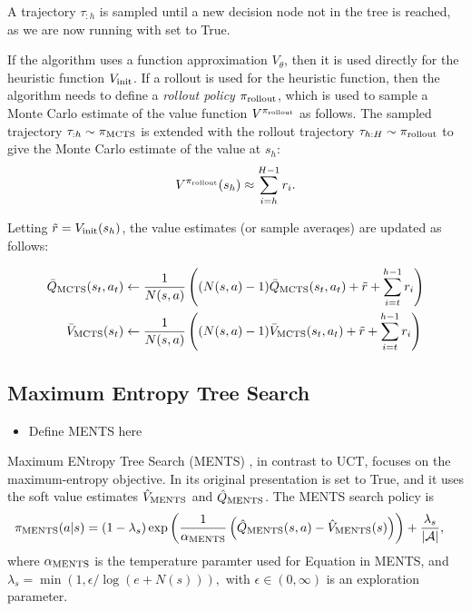        A trajectory $\tau_{:h}$ is sampled until a new decision node not in the tree is reached, as we are now running with \mctsmode set to True.

        If the algorithm uses a function approximation $V_\theta$, then it is used directly for the heuristic function ${V_{\textnormal{init}}}$. If a rollout is used for the heuristic function, then the algorithm needs to define a \textit{rollout policy} $\pi_{{\textnormal{rollout}}}$, which is used to sample a Monte Carlo estimate of the value function $V^{\pi_{{\textnormal{rollout}}}}$ as follows. The sampled trajectory $\tau_{:h}\sim\pi_{{\textnormal{MCTS}}}$ is extended with the rollout trajectory $\tau_{h:H}\sim\pi_{{\textnormal{rollout}}}$ to give the Monte Carlo estimate of the value at $s_h$:
        \begin{align}
            V^{\pi_{{\textnormal{rollout}}}}(s_h) \approx \sum_{i=h}^{H-1} r_i.
        \end{align}
        
        Letting $\tilde{r} = {V_{\textnormal{init}}}(s_h)$, the value estimates (or sample averaqes) are updated as follows:

        \begin{align}
            \bar{Q}_{{\textnormal{MCTS}}}(s_t,a_t) &\leftarrow 
                \frac{1}{N(s,a)} \left( (N(s,a)-1) \bar{Q}_{{\textnormal{MCTS}}}(s_t,a_t) 
                    + \tilde{r} + \sum_{i=t}^{h-1} r_i \right) \\
            \bar{V}_{{\textnormal{MCTS}}}(s_t) &\leftarrow 
                \frac{1}{N(s,a)} \left( (N(s,a)-1) \bar{V}_{{\textnormal{MCTS}}}(s_t,a_t) 
                    + \tilde{r} + \sum_{i=t}^{h-1} r_i \right) 
        \end{align}  

    
    \subsection{Maximum Entropy Tree Search}
    \label{sec:2-3-4-ments}
    
        \begin{itemize}
            \item Define MENTS here
        \end{itemize}



        Maximum ENtropy Tree Search (MENTS) , in contrast to UCT, focuses on the maximum-entropy objective. In its original presentation \mctsmode is set to True, and it uses the soft value estimates $\hat{V}_{{\textnormal{MENTS}}}$ and $\hat{Q}_{{\textnormal{MENTS}}}$. The MENTS search policy is
        \begin{align}
            {\pi_{{\textnormal{MENTS}}}}(a|s) &= 
                (1-\lambda_s)\exp\left(\frac{1}{\alpha_{{\textnormal{MENTS}}}}\left({\hat{Q}_{{\textnormal{MENTS}}}}(s,a)-{\hat{V}_{{\textnormal{MENTS}}}}(s)\right)\right) 
                    + \frac{\lambda_s}{|\mathcal{A}|},
        \end{align}
        where $\alpha_{{\textnormal{MENTS}}}$ is the temperature paramter used for Equation  in MENTS, and $\lambda_s=\min(1,\epsilon/\log(e+N(s))),$ with $\epsilon \in (0,\infty)$ is an exploration parameter.

